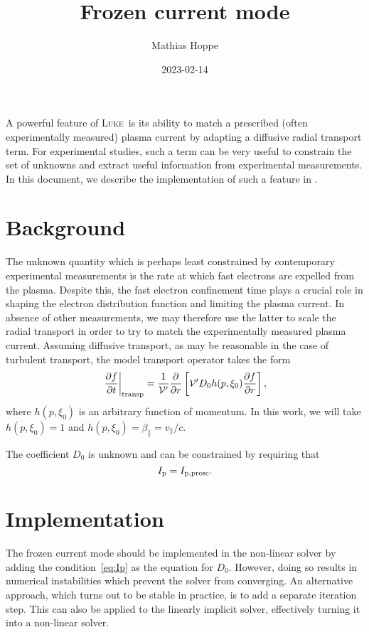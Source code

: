 \documentclass{notes}
\title{Frozen current mode}
\author{Mathias Hoppe}
\date{2023-02-14}
\newcommand{\LUKE}{\textsc{Luke}}
\newcommand{\Vp}{\mathcal{V}'}
\begin{document}
	\maketitle

	A powerful feature of \LUKE\ is its ability to match a prescribed (often
	experimentally measured) plasma current by adapting a diffusive radial
	transport term. For experimental studies, such a term can be very useful
	to constrain the set of unknowns and extract useful information from
	experimental measurements. In this document, we describe the implementation
	of such a feature in \DREAM.

	\tableofcontents

	\section{Background}
	The unknown quantity which is perhaps least constrained by contemporary
	experimental measurements is the rate at which fast electrons are expelled
	from the plasma. Despite this, the fast electron confinement time plays a
	crucial role in shaping the electron distribution function and limiting the
	plasma current. In absence of other measurements, we may therefore use the
	latter to scale the radial transport in order to try to match the
	experimentally measured plasma current. Assuming diffusive transport, as
	may be reasonable in the case of turbulent transport, the model transport
	operator takes the form
	\begin{equation}\label{eq:transp}
		\left.\frac{\partial f}{\partial t}\right|_{\rm transp} =
			\frac{1}{\Vp}\frac{\partial}{\partial r}\left[
				\Vp D_0h(p,\xi_0)\frac{\partial f}{\partial r}
			\right],
	\end{equation}
	where $h(p,\xi_0)$ is an arbitrary function of momentum. In this work, we
	will take $h(p,\xi_0)=1$ and $h(p,\xi_0)=\beta_\parallel=v_\parallel/c$.

	The coefficient $D_0$ is unknown and can be constrained by requiring that
	\begin{equation}\label{eq:Ip}
		I_{\rm p} = I_{\rm p,presc}.
	\end{equation}

	\section{Implementation}\label{sec:implementation}
	The frozen current mode should be implemented in the non-linear solver by
	adding the condition~\eqref{eq:Ip} as the equation for $D_0$. However, doing
	so results in numerical instabilities which prevent the solver from
	converging. An alternative approach, which turns out to be stable in
	practice, is to add a separate iteration step. This can also be applied to
	the linearly implicit solver, effectively turning it into a non-linear
	solver.
\end{document}
